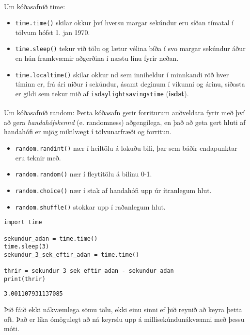 \paragraph{}
Um kóðasafnið time:

\begin{itemize}
	\item \texttt{time.time()} skilar okkur því hversu margar sekúndur eru síðan tímatal í tölvum hófst 1. jan 1970.
	\item \texttt{time.sleep()} tekur við tölu og lætur vélina bíða í svo margar sekúndur áður en hún framkvæmir aðgerðina í næstu línu fyrir neðan.
	\item \texttt{time.localtime()} skilar okkur nd sem inniheldur í minnkandi röð hver tíminn er, frá ári niður í sekúndur, ásamt deginum í vikunni og árinu, síðasta er gildi sem tekur mið af \texttt{isdaylightsavingstime} (\textbf{isdst}).
\end{itemize}

\paragraph{}
Um kóðasafnið random: Þetta kóðasafn gerir forriturum auðveldara fyrir með því að gera \textit{handahófskennd} (e. randomness) aðgengilega, en það að geta gert hluti af handahófi er mjög mikilvægt í tölvunarfræði og forritun.

\begin{itemize}
	\item \texttt{random.randint()} nær í heiltölu á lokuðu bili, þar sem báðir endapunktar eru teknir með.
	\item \texttt{random.random()} nær í fleytitölu á bilinu 0-1.
	\item \texttt{random.choice()} nær í stak af handahófi upp úr ítranlegum hlut.
	\item \texttt{random.shuffle()} stokkar upp í raðanlegum hlut.
\end{itemize}
\vspace{1cm}
\begin{lstlisting}[caption=Notkun kóðasafna með time, label=lst:kóðasöfn-kynnt-time]
import time

sekundur_adan = time.time()
time.sleep(3)
sekundur_3_sek_eftir_adan = time.time()

thrir = sekundur_3_sek_eftir_adan - sekundur_adan
print(thrir)
\end{lstlisting}
\lstset{style=uttak}
\begin{lstlisting}
3.001107931137085
\end{lstlisting}
\lstset{style=venjulegt}
\vspace{1cm}
Þið fáið ekki nákvæmlega sömu tölu, ekki einu sinni ef þið reynið að keyra þetta oft. Það er líka ómögulegt að ná keyrslu upp á millisekúndunákvæmni með þessu móti.

